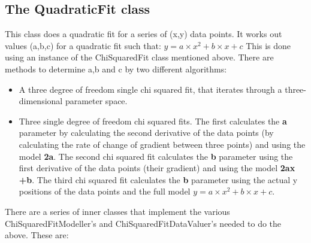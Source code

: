 \documentclass[10pt,a4paper]{article}
\begin{document}
\subsection{The QuadraticFit class}
\label{sec:quadraticfitclass}
This class does a quadratic fit for a series of (x,y) data points. 
It works out values (a,b,c) for a quadratic fit such that:
\begin{math}
y = a \times x^2 + b \times x + c 
\end{math}
This is done using an instance of the ChiSquaredFit class mentioned above. There are methods to
determine a,b and c by two different algorithms:
\begin{itemize}
\item A three degree of freedom single chi squared fit, that iterates through a three-dimensional parameter space.
\item Three single degree of freedom chi squared fits. The first calculates the {\bf a} parameter by calculating
        the second derivative of the data points (by calculating the rate of change of gradient between 
        three points) and using the model {\bf 2a}. 
	The second chi squared fit calculates the {\bf b} parameter using the first derivative of the data points 
	(their gradient) and using the model {\bf 2ax +b}. 
	The third chi squared fit calculates the {\bf b} parameter using the actual y positions of the data points
	and the full model $y = a \times x^2 + b \times x + c$.
\end{itemize}
There are a series of inner classes that implement the various ChiSquaredFitModeller's and ChiSquaredFitDataValuer's
needed to do the above. These are:
\end{document}
